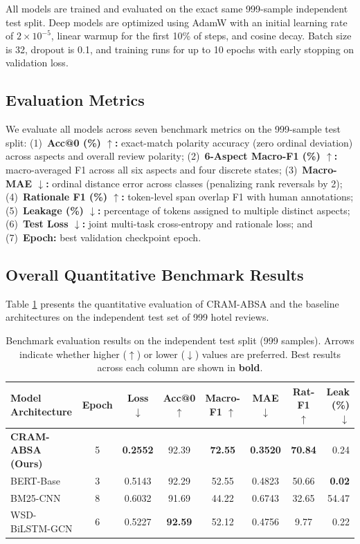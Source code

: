 \documentclass{llncs}
\begin{document}
All models are trained and evaluated on the exact same 999-sample independent test split. Deep models are optimized using AdamW with an initial learning rate of $2 \times 10^{-5}$, linear warmup for the first 10\% of steps, and cosine decay. Batch size is 32, dropout is 0.1, and training runs for up to 10 epochs with early stopping on validation loss.

\subsection{Evaluation Metrics}
\label{subsec:evaluation_metrics}
We evaluate all models across seven benchmark metrics on the 999-sample test split: (1)~\textbf{Acc@0 (\%) $\uparrow$:} exact-match polarity accuracy (zero ordinal deviation) across aspects and overall review polarity; (2)~\textbf{6-Aspect Macro-F1 (\%) $\uparrow$:} macro-averaged F1 across all six aspects and four discrete states; (3)~\textbf{Macro-MAE $\downarrow$:} ordinal distance error across classes (penalizing rank reversals by 2); (4)~\textbf{Rationale F1 (\%) $\uparrow$:} token-level span overlap F1 with human annotations; (5)~\textbf{Leakage (\%) $\downarrow$:} percentage of tokens assigned to multiple distinct aspects; (6)~\textbf{Test Loss $\downarrow$:} joint multi-task cross-entropy and rationale loss; and (7)~\textbf{Epoch:} best validation checkpoint epoch.

\subsection{Overall Quantitative Benchmark Results}
\label{subsec:overall_results}
Table \ref{tab:overall_benchmark} presents the quantitative evaluation of CRAM-ABSA and the baseline architectures on the independent test set of 999 hotel reviews.

\begin{table}[t]
\centering
\caption{Benchmark evaluation results on the independent test split (999 samples). Arrows indicate whether higher ($\uparrow$) or lower ($\downarrow$) values are preferred. Best results across each column are shown in \textbf{bold}.}
\label{tab:overall_benchmark}
\setlength{\tabcolsep}{3.8pt}
\small
\begin{tabular}{lccccccr}
\toprule
\textbf{Model Architecture} & \textbf{Epoch} & \textbf{Loss} $\downarrow$ & \textbf{Acc@0} $\uparrow$ & \textbf{Macro-F1} $\uparrow$ & \textbf{MAE} $\downarrow$ & \textbf{Rat-F1} $\uparrow$ & \textbf{Leak (\%)} $\downarrow$ \\
\midrule
\textbf{CRAM-ABSA (Ours)} & 5 & \textbf{0.2552} & 92.39 & \textbf{72.55} & \textbf{0.3520} & \textbf{70.84} & 0.24 \\
BERT-Base \cite{ref01_bimaputra2023} & 3 & 0.5143 & 92.29 & 52.55 & 0.4823 & 50.66 & \textbf{0.02} \\
BM25-CNN \cite{ref04_namee2023} & 8 & 0.6032 & 91.69 & 44.22 & 0.6743 & 32.65 & 54.47 \\
WSD-BiLSTM-GCN \cite{ref09_nadeem2025} & 6 & 0.5227 & \textbf{92.59} & 52.12 & 0.4756 & 9.77 & 0.22 \\
\bottomrule
\end{tabular}
\end{table}
\end{document}

